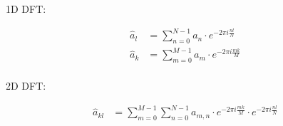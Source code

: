 \documentclass[a4paper,12pt]{article}
\begin{document}
	1D DFT:
	
	\begin{align*}
		\hat{a}_l &= \sum\limits_{n = 0}^{N - 1} a_n \cdot e^{-2 \pi i \frac{nl}{N}} \\
		\hat{a}_k &= \sum\limits_{m = 0}^{M - 1} a_m \cdot e^{-2 \pi i \frac{mk}{M}} \\
	\end{align*}
	
	2D DFT:
	
	\begin{align*}
	\hat{a}_{kl} &= \sum\limits_{m = 0}^{M - 1} \sum\limits_{n = 0}^{N - 1} a_{m, n} \cdot e^{-2 \pi i \frac{mk}{M}} \cdot e^{-2 \pi i \frac{nl}{N}} \\
	\end{align*}
\end{document}
